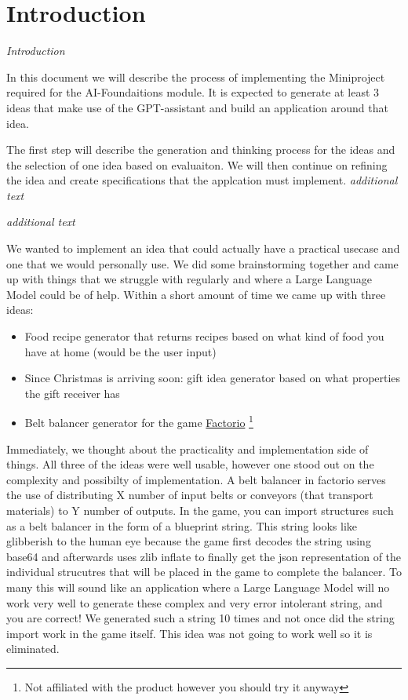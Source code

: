 \chapter{Introduction}
\label{chapter:introduction}

\emph{Introduction}

In this document we will describe the process of implementing the Miniproject required for the AI-Foundaitions module.
It is expected to generate at least 3 ideas that make use of the GPT-assistant and build an application around that idea.

The first step will describe the generation and thinking process for the ideas and the selection of one idea based on evaluaiton.
We will then continue on refining the idea and create specifications that the applcation must implement.
\emph{additional text}

\medskip

\emph{additional text}

We wanted to implement an idea that could actually have a practical usecase and one that we would personally use.
We did some brainstorming together and came up with things that we struggle with regularly and where a Large Language Model could be of help.
Within a short amount of time we came up with three ideas:
\begin{itemize}
    \item Food recipe generator that returns recipes based on what kind of food you have at home (would be the user input)
    \item Since Christmas is arriving soon: gift idea generator based on what properties the gift receiver has
    \item Belt balancer generator for the game \href{https://www.factorio.com}{Factorio} \footnote{Not affiliated with the product however you should try it anyway}
\end{itemize}

Immediately, we thought about the practicality and implementation side of things. All three of the ideas were well usable, however one stood out on the complexity and possibilty of implementation.
A belt balancer in factorio serves the use of distributing X number of input belts or conveyors (that transport materials) to Y number of outputs.
In the game, you can import structures such as a belt balancer in the form of a blueprint string.
This string looks like glibberish to the human eye because the game first decodes the string using base64 and afterwards uses zlib inflate to finally get the json representation of the individual strucutres that will be placed in the game to complete the balancer.
To many this will sound like an application where a Large Language Model will no work very well to generate these complex and very error intolerant string, and you are correct!
We generated such a string 10 times and not once did the string import work in the game itself.
This idea was not going to work well so it is eliminated.

